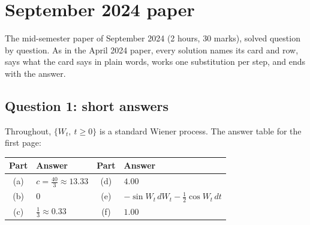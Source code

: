 \chapter{September 2024 paper}
\label{ch:paper-2024-sep}

\begin{whatfor}
The mid-semester paper of September 2024 (2 hours, 30 marks), solved question by question. As in the April 2024 paper, every solution names its card and row, says what the card says in plain words, works one substitution per step, and ends with the answer.
\end{whatfor}

\section{Question 1: short answers}

Throughout, $\{W_t,\ t\ge0\}$ is a standard Wiener process. The answer table for the first page:

\begin{center}
\begin{tabular}{@{}cl@{\qquad}cl@{}}
\toprule
Part & Answer & Part & Answer\\
\midrule
(a) & $c=\frac{40}3\approx13.33$ & (d) & $4.00$\\
(b) & $0$ & (e) & $-\sin W_t\,dW_t-\frac12\cos W_t\,dt$\\
(c) & $\frac13\approx0.33$ & (f) & $1.00$\\
\bottomrule
\end{tabular}
\end{center}

